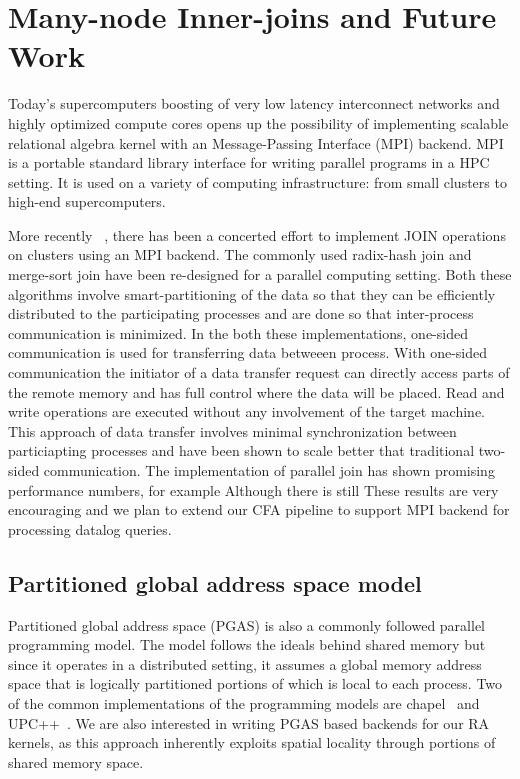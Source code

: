\section{Many-node Inner-joins and Future Work}
Today's supercomputers boosting of very low latency interconnect networks and highly optimized compute cores
opens up the possibility of implementing scalable relational algebra kernel with an Message-Passing Interface (MPI) backend.
MPI is a portable standard library interface for writing parallel programs in a HPC setting. 
It is used on a variety of computing infrastructure: from small clusters to high-end supercomputers. 

More recently ~\cite{Barthels:2017:DJA:3055540.3055545, Barthels:2015:RIJ:2723372.2750547}, there has been a concerted effort to implement JOIN operations on clusters using an MPI backend. 
The commonly used radix-hash join and merge-sort join have been re-designed for a parallel computing setting. 
Both these algorithms involve smart-partitioning of the data so that they can be efficiently distributed 
to the participating processes and are done so that inter-process communication is minimized. In the both these implementations,
one-sided communication is used for transferring data betweeen process. With one-sided communication the initiator of a data transfer request can directly access
parts of the remote memory and has full control where the data will be placed. Read and write operations are executed
without any involvement of the target machine. This approach of data transfer involves minimal synchronization between particiapting processes and have been shown to scale better that traditional two-sided communication. The implementation of parallel join has shown promising performance numbers, for example 
Although there is still
These results are very encouraging and we plan to extend our CFA pipeline to support MPI backend for processing datalog queries.


\subsection{Partitioned global address space model}
Partitioned global address space (PGAS) is also a commonly followed parallel programming model.
The model follows the ideals behind shared memory but since it operates in a distributed setting,
it assumes a global memory address space that is logically partitioned portions of which is 
local to each process. Two of the common implementations of the programming models are chapel~\cite{doi:10.1177/1094342007078442} and UPC++~\cite{6877339}. 
We are also interested in writing PGAS based backends for our RA kernels, 
as this approach inherently exploits spatial locality through portions of shared memory space.

